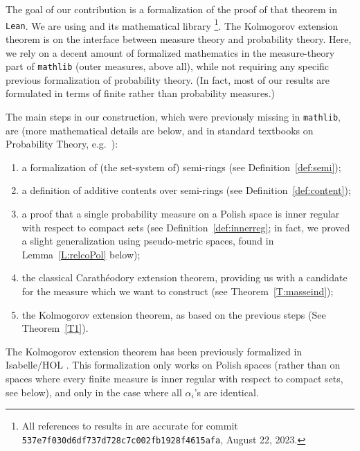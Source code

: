 \documentclass[lean]{DraftAFM}
\begin{document}
The goal of our contribution is a formalization of the proof of that theorem in {\tt Lean}. We are using \cite{moura2021lean} and its mathematical library  \cite{mathlib2020lean}\footnote{All references to results in  are accurate for commit {\tt 537e7f030d6df737d728c7c002fb1928f4615afa}, August 22, 2023.}.
The Kolmogorov extension theorem is on the interface between measure theory and probability theory. Here, we rely on a decent amount of formalized mathematics in the measure-theory part of {\tt mathlib} (outer measures, above all), while not requiring any specific previous formalization of probability theory. (In fact, most of our results are formulated in terms of finite rather than probability measures.)

The main steps in our construction, which were previously missing in {\tt mathlib}, are (more mathematical details are below, and in standard textbooks on Probability Theory, e.g.\ \cite{Klenke2013, Kallenberg2020}):
\begin{enumerate}
\item a formalization of (the set-system of) semi-rings (see
  Definition~\ref{def:semi});
\item a definition of additive contents over semi-rings (see Definition~\ref{def:content});
\item a proof that a single probability measure on a Polish space is inner regular with respect to compact sets (see Definition~\ref{def:innerreg}; in fact, we proved a slight generalization using pseudo-metric spaces, found in Lemma~\ref{L:relcoPol} below);
\item the classical Carathéodory extension theorem, providing us with a candidate for the measure which we want to construct (see Theorem~\ref{T:masseind});
\item the Kolmogorov extension theorem, as based on the previous steps (See Theorem~\ref{T1}).
\end{enumerate}
The Kolmogorov extension theorem has been previously formalized in Isabelle/HOL \cite{Immler2012}. This formalization only works on Polish spaces (rather than on spaces where every finite measure is inner regular with respect to compact sets, see below), and only in the case where all $\alpha_i$'s are identical. %
\end{document}
